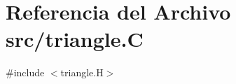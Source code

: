 \hypertarget{triangle_8_c}{}\section{Referencia del Archivo src/triangle.C}
\label{triangle_8_c}
{\ttfamily \#include $<$triangle.\+H$>$}\newline
